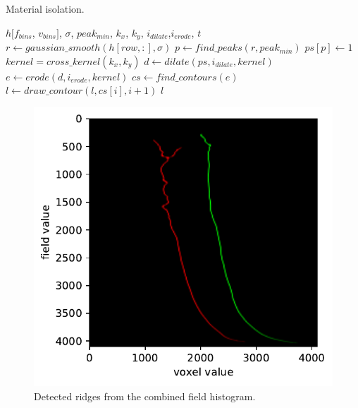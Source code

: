 \begin{algorithm}
    \caption{Material isolation.}
    \label{alg:material}
    \begin{algorithmic}
         {$h[f_{bins}$, $v_{bins}]$, $\sigma$, $peak_{min}$, $k_x$, $k_y$, \newline \indent \indent $i_{dilate}$,$i_{erode}$, $t$}
                \State $r \gets gaussian\_smooth(h[row,:], \sigma)$
                \State $p \gets find\_peaks(r, peak_{min})$
                \State $ps[p] \gets 1$
            \EndFor
            \State $kernel = cross\_kernel(k_x, k_y)$
            \State $d \gets dilate(ps, i_{dilate}, kernel)$
            \State $e \gets erode(d, i_{erode}, kernel)$
            \State $cs \gets find\_contours(e)$
                    \State $l \gets draw\_contour(l, cs[i], i+1)$
                \EndIf
            \EndFor
            \Return $l$
        \EndFunction
    \end{algorithmic}
\end{algorithm}

\begin{figure}
    \includegraphics[width=\linewidth]{figures/ridges_gauss+edt-bone_region3.pdf}
    \caption{Detected ridges from the combined field histogram.}
    \label{fig:curves}
\end{figure}

